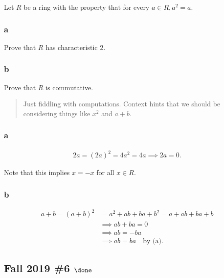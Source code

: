 Let \(R\) be a ring with the property that for every
\(a \in R, a^2 = a\).

\hypertarget{a-31}{%
\subsubsection{a}\label{a-31}}

Prove that \(R\) has characteristic 2.

\hypertarget{b-21}{%
\subsubsection{b}\label{b-21}}

Prove that \(R\) is commutative.

\begin{solution}

\begin{quote}
Just fiddling with computations. Context hints that we should be
considering things like \(x^2\) and \(a+b\).
\end{quote}

\hypertarget{a-32}{%
\subsubsection{a}\label{a-32}}

\begin{align*}
2a  = (2a)^2 = 4a^2 = 4a \implies 2a = 0
.\end{align*}

Note that this implies \(x = -x\) for all \(x\in R\).

\hypertarget{b-22}{%
\subsubsection{b}\label{b-22}}

\begin{align*}
a+b = (a+b)^2 &= a^2 + ab + ba + b^2 = a + ab + ba + b \\
&\implies ab + ba = 0 \\
&\implies ab = -ba \\
&\implies ab = ba \quad\text{by (a)}
.\end{align*}

\end{solution}

\hypertarget{fall-2019-6-done}{%
\subsection{\texorpdfstring{Fall 2019 \#6
\(\done\)}{Fall 2019 \#6 \textbackslash done}}\label{fall-2019-6-done}}


